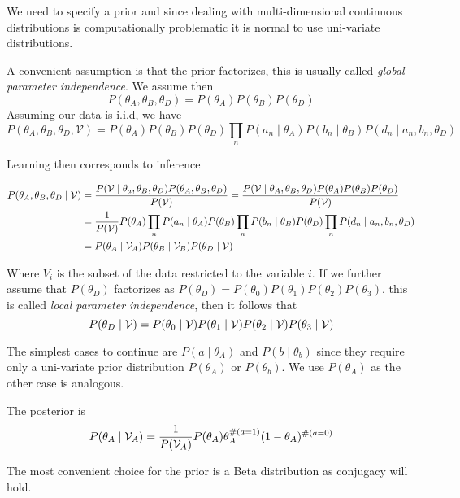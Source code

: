 We need to specify a prior and since dealing with multi-dimensional continuous
distributions is computationally problematic it is normal to use uni-variate
distributions.

A convenient assumption is that the prior factorizes, this is usually called
\emph{global parameter independence}. We assume then
\[
  P(\theta_{A}, \theta_{B}, \theta_{D}) = P(\theta_{A})P(\theta_{B})P(\theta_{D})
\]
Assuming our data is i.i.d, we have
\[
  P(\theta_{A}, \theta_{B}, \theta_{D}, \mathcal{V}) = P(\theta_{A})P(\theta_{B})P(\theta_{D})\prod_{n}P(a_{n}\mid \theta_{A})P(b_{n} \mid \theta_{B})P(d_{n}\mid a_{n}, b_{n}, \theta_{D})
\]

Learning then corresponds to inference

\[
  \begin{aligned}
    P(\theta_{A}, \theta_{B}, \theta_{D}\mid \mathcal{V}) &= \frac{P(\mathcal{V} \mid \theta_{a}, \theta_{B}, \theta_{D})P(\theta_{A}, \theta_{B}, \theta_{D})}{P(\mathcal{V})} =\frac{P(\mathcal{V} \mid \theta_{A}, \theta_{B}, \theta_{D})P(\theta_{A}) P(\theta_{B})P( \theta_{D})}{P(\mathcal{V})}\\
    &= \frac{1}{P(\mathcal{V})}P(\theta_{A})\prod_{n}P(a_{n}\mid \theta_{A})P(\theta_{B})\prod_{n}P(b_{n}\mid \theta_{B})P(\theta_{D})\prod_{n}P(d_{n}\mid a_{n}, b_{n},\theta_{D})\\
    &= P(\theta_{A} \mid \mathcal{V}_{A} )P(\theta_{B}\mid \mathcal{V}_{B})P(\theta_{D} \mid \mathcal{V})
  \end{aligned}
\]

Where \(V_{i}\) is the subset of the data restricted to the variable \(i\). If
we further assume that \(P(\theta_{D})\) factorizes as
\(P(\theta_{D}) = P(\theta_{0})P(\theta_{1})P(\theta_{2})P(\theta_{3})\),
this is called \emph{local parameter independence}, then it follows that
\[
  P(\theta_{D}\mid \mathcal{V}) = P(\theta_{0} \mid \mathcal{V} )P(\theta_{1} \mid \mathcal{V} )P(\theta_{2} \mid \mathcal{V} )P(\theta_{3} \mid \mathcal{V} )
\]

The simplest cases to continue are \(P(a\mid \theta_{A})\) and
\(P(b \mid \theta_{b})\) since they require only a uni-variate prior distribution
\(P(\theta_{A})\) or \(P(\theta_{b})\). We use \(P(\theta_{A})\) as the other
case is analogous.

The posterior is
\[
  P(\theta_{A} \mid \mathcal{V}_{A}) = \frac{1}{P(\mathcal{V}_{A})}P(\theta_{A})\theta_{A}^{\#(a=1)}(1-\theta_{A})^{\#(a=0)}
\]

The most convenient choice for the prior is a Beta distribution as conjugacy
will hold.

